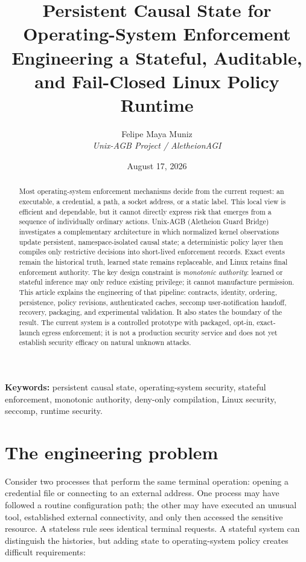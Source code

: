 \documentclass[11pt,a4paper]{article}
\title{Persistent Causal State for Operating-System Enforcement\\
\large Engineering a Stateful, Auditable, and Fail-Closed Linux Policy Runtime}
\author{
Felipe Maya Muniz\\
\textit{Unix-AGB Project / AletheionAGI}
}
\date{August 17, 2026}
\begin{document}
\maketitle

\begin{abstract}
Most operating-system enforcement mechanisms decide from the current request:
an executable, a credential, a path, a socket address, or a static label. This
local view is efficient and dependable, but it cannot directly express risk
that emerges from a sequence of individually ordinary actions. Unix-AGB
(Aletheion Guard Bridge) investigates a complementary architecture in which
normalized kernel observations update persistent, namespace-isolated causal
state; a deterministic policy layer then compiles only restrictive decisions
into short-lived enforcement records. Exact events remain the historical
truth, learned state remains replaceable, and Linux retains final enforcement
authority. The key design constraint is \emph{monotonic authority}: learned or
stateful inference may only reduce existing privilege; it cannot manufacture
permission. This article explains the engineering of that pipeline: contracts,
identity, ordering, persistence, policy revisions, authenticated caches,
seccomp user-notification handoff, recovery, packaging, and experimental
validation. It also states the boundary of the result. The current system is a
controlled prototype with packaged, opt-in, exact-launch egress enforcement;
it is not a production security service and does not yet establish security
efficacy on natural unknown attacks.
\end{abstract}

\noindent\textbf{Keywords:}
persistent causal state,
operating-system security,
stateful enforcement,
monotonic authority,
deny-only compilation,
Linux security,
seccomp,
runtime security.

\section{The engineering problem}

Consider two processes that perform the same terminal operation: opening a
credential file or connecting to an external address. One process may have
followed a routine configuration path; the other may have executed an unusual
tool, established external connectivity, and only then accessed the sensitive
resource. A stateless rule sees identical terminal requests. A stateful system
can distinguish the histories, but adding state to operating-system policy
creates difficult requirements:
\end{document}
